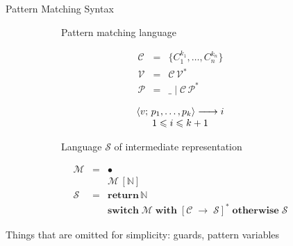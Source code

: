 \documentclass[aspectratio=169
  , xcolor={svgnames}
  , hyperref={ colorlinks,citecolor=Blue
             , linkcolor=DarkRed,urlcolor=DarkBlue}
  , russian
  ]{beamer}
\def\transarrow{\xrightarrow}
\def\padding{\phantom{X}}
\def\subarrow{}
\newcommand{\trans}[3]{{#1}\transarrow{\padding{\textstyle #2}\padding}\subarrow{#3}}
\newcommand{\inbr}[1]{\left<{#1}\right>}
\newcommand{\primi}[1]{\ensuremath{\mathbf{#1}}}
\newcommand{\ir}{\ensuremath{\mathcal{S}}}
\begin{document}
\begin{frame}[fragile]{Pattern Matching Syntax}
\begin{figure}[ht]
\begin{subfigure}[t]{0.4\linewidth}
\begin{center}
Pattern matching language
\end{center}
\[
 \begin{array}{rcll}
    \mathcal{C} & = & \{ C_1^{k_1}, \dots, C_n^{k_n} \}\\
    \mathcal{V} & = & \mathcal{C}\,\mathcal{V}^*\\  
    \mathcal{P} & = & \_ \mid \mathcal{C}\,\mathcal{P}^*
 \end{array}
\]
\[
 \begin{array}{c}
\trans{\inbr{v;\,p_1,\dots,p_k}}{}{i}\\
1\leqslant i\leqslant k+1
 \end{array}
\]
\end{subfigure}
\hspace{0.5cm}
\begin{subfigure}[t]{0.5\linewidth}
\begin{center}
Language \ir{} of intermediate representation
\end{center}
\[
\begin{array}{rcl}
  \mathcal M & = & \bullet \\
  &   & \mathcal M\,[\mathbb{N}] \\
  \ir & = & \primi{return}\,\mathbb{N} \\
  &   & \primi{switch}\;\mathcal{M}\;\primi{with}\; [\mathcal{C}\; \primi{\rightarrow}\; \ir]^*\;\primi{otherwise}\;\ir
\end{array}
\]
\end{subfigure}
\end{figure}
\vspace{0.5cm}
Things that are omitted for simplicity: guards, pattern variables

\end{frame}
\end{document}
